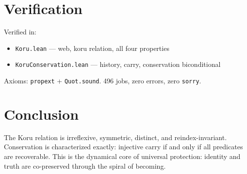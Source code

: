 \documentclass[12pt,a4paper]{article}
\begin{document}
\section{Verification}

Verified in:
\begin{itemize}
    \item \texttt{Koru.lean} --- web, koru relation, all four properties
    \item \texttt{KoruConservation.lean} --- history, carry, conservation biconditional
\end{itemize}

Axioms: \texttt{propext} + \texttt{Quot.sound}.
496 jobs, zero errors, zero \texttt{sorry}.

\section{Conclusion}

The Koru relation is irreflexive, symmetric, distinct, and reindex-invariant.
Conservation is characterized exactly: injective carry if and only if all
predicates are recoverable. This is the dynamical core of universal protection:
identity and truth are co-preserved through the spiral of becoming.
\end{document}
